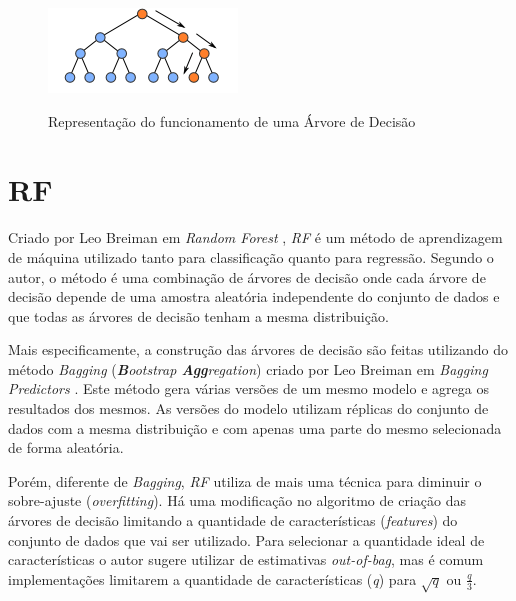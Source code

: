 \begin{figure}[h]
    \centering
    \includegraphics[scale=1.5]{monography/img/decision_tree.png}
    \label{figure:rf}
    \caption{Representação do funcionamento de uma Árvore de Decisão\footnotemark}
\end{figure}


\section{\acrfull{RF}}

Criado por Leo Breiman em \textit{Random Forest} \cite{Breiman:2001:RF:570181.570182}, \textit{\acrshort{RF}} é um método de aprendizagem de máquina utilizado tanto para classificação quanto para regressão. Segundo o autor, o método é uma combinação de árvores de decisão onde cada árvore de decisão depende de uma amostra aleatória independente do conjunto de dados e que todas as árvores de decisão tenham a mesma distribuição. 

Mais especificamente, a construção das árvores de decisão são feitas utilizando do método \textit{Bagging} (\textit{\textbf{B}ootstrap \textbf{Agg}regation}) criado por Leo Breiman em \textit{Bagging Predictors} \cite{Breiman:1996:BP:231986.231989}. Este método gera várias versões de um mesmo modelo e agrega os resultados dos mesmos. As versões do modelo utilizam réplicas do conjunto de dados com a mesma distribuição e com apenas uma parte do mesmo selecionada de forma aleatória.

Porém, diferente de \textit{Bagging}, \textit{\acrshort{RF}} utiliza de mais uma técnica para diminuir o sobre-ajuste (\textit{overfitting}). Há uma modificação no algoritmo de criação das árvores de decisão limitando a quantidade de características (\textit{features}) do conjunto de dados que vai ser utilizado. Para selecionar a quantidade ideal de características o autor sugere utilizar de estimativas \textit{out-of-bag}, mas é comum implementações limitarem a quantidade de características (\textit{q}) para $ \sqrt{q} $ ou $ \frac{q}{3} $.

